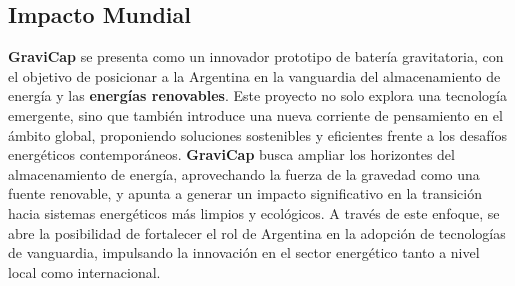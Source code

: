             \subsection{Impacto Mundial}
                \textcolor{dark_violet}{\textbf{GraviCap}} se presenta como un innovador prototipo de batería gravitatoria, con el objetivo de posicionar a la Argentina en la vanguardia del almacenamiento de energía y las \textbf{energías renovables}. Este proyecto no solo explora una tecnología emergente, sino que también introduce una nueva corriente de pensamiento en el ámbito global, proponiendo soluciones sostenibles y eficientes frente a los desafíos energéticos contemporáneos. \textcolor{dark_violet}{\textbf{GraviCap}} busca ampliar los horizontes del almacenamiento de energía, aprovechando la fuerza de la gravedad como una fuente renovable, y apunta a generar un impacto significativo en la transición hacia sistemas energéticos más limpios y ecológicos. A través de este enfoque, se abre la posibilidad de fortalecer el rol de Argentina en la adopción de tecnologías de vanguardia, impulsando la innovación en el sector energético tanto a nivel local como internacional.\par
                
